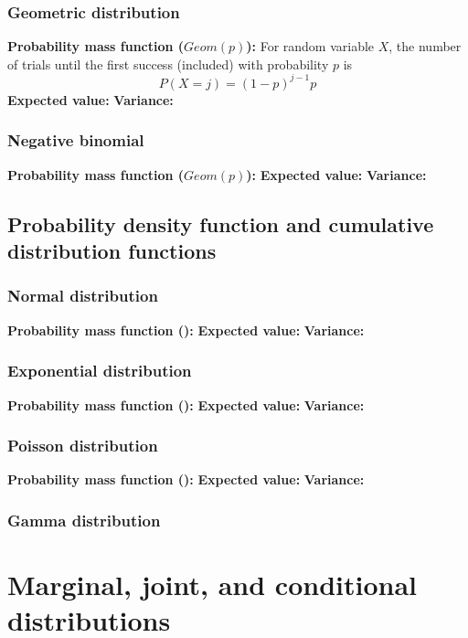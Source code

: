 \documentclass{article}
\begin{document}
\subsubsection{Geometric distribution}
\textbf{Probability mass function ($Geom(p)$):} For random variable $X$, the number of trials until the first success (included) with probability $p$ is
\begin{equation*}
    P(X=j) = (1-p)^{j-1}p
\end{equation*}
\textbf{Expected value:}
\textbf{Variance:}

\subsubsection{Negative binomial}
\textbf{Probability mass function ($Geom(p)$):}
\textbf{Expected value:}
\textbf{Variance:}

\subsection{Probability density function and cumulative distribution functions}
\subsubsection{Normal distribution}
\textbf{Probability mass function ():}
\textbf{Expected value:}
\textbf{Variance:}
\subsubsection{Exponential distribution}
\textbf{Probability mass function ():}
\textbf{Expected value:}
\textbf{Variance:}
\subsubsection{Poisson distribution}
\textbf{Probability mass function ():}
\textbf{Expected value:}
\textbf{Variance:}
\subsubsection{Gamma distribution}

\section{Marginal, joint, and conditional distributions}

\end{document}
